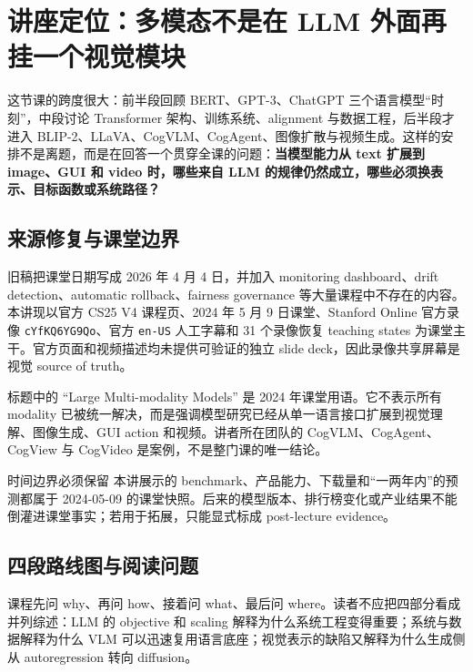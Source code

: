 \section{讲座定位：多模态不是在 LLM 外面再挂一个视觉模块}

这节课的跨度很大：前半段回顾 BERT、GPT-3、ChatGPT 三个语言模型“时刻”，中段讨论 Transformer 架构、训练系统、alignment 与数据工程，后半段才进入 BLIP-2、LLaVA、CogVLM、CogAgent、图像扩散与视频生成。这样的安排不是离题，而是在回答一个贯穿全课的问题：\textbf{当模型能力从 text 扩展到 image、GUI 和 video 时，哪些来自 LLM 的规律仍然成立，哪些必须换表示、目标函数或系统路径？}

\subsection{来源修复与课堂边界}

旧稿把课堂日期写成 2026 年 4 月 4 日，并加入 monitoring dashboard、drift detection、automatic rollback、fairness governance 等大量课程中不存在的内容。本讲现以官方 CS25 V4 课程页、2024 年 5 月 9 日课堂、Stanford Online 官方录像 \texttt{cYfKQ6YG9Qo}、官方 \texttt{en-US} 人工字幕和 31 个录像恢复 teaching states 为课堂主干。官方页面和视频描述均未提供可验证的独立 slide deck，因此录像共享屏幕是视觉 source of truth。


标题中的 ``Large Multi-modality Models'' 是 2024 年课堂用语。它不表示所有 modality 已被统一解决，而是强调模型研究已经从单一语言接口扩展到视觉理解、图像生成、GUI action 和视频。讲者所在团队的 CogVLM、CogAgent、CogView 与 CogVideo 是案例，不是整门课的唯一结论。

\begin{warningbox}{时间边界必须保留}
本讲展示的 benchmark、产品能力、下载量和“一两年内”的预测都属于 2024-05-09 的课堂快照。后来的模型版本、排行榜变化或产业结果不能倒灌进课堂事实；若用于拓展，只能显式标成 post-lecture evidence。
\end{warningbox}

\subsection{四段路线图与阅读问题}

课程先问 why、再问 how、接着问 what、最后问 where。读者不应把四部分看成并列综述：LLM 的 objective 和 scaling 解释为什么系统工程变得重要；系统与数据解释为什么 VLM 可以迅速复用语言底座；视觉表示的缺陷又解释为什么生成侧从 autoregression 转向 diffusion。


